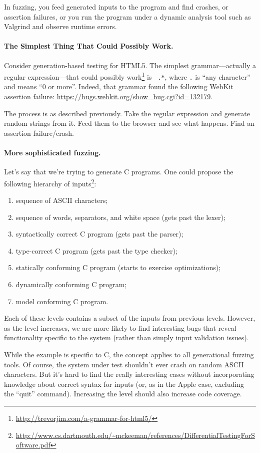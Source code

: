 \documentclass[11pt]{article}
\begin{document}
In fuzzing, you feed generated inputs to the program and find
crashes, or assertion failures, or you run the program under a dynamic
analysis tool such as Valgrind and observe runtime errors.

\paragraph{The Simplest Thing That Could Possibly Work.}
Consider generation-based testing for HTML5.  The simplest grammar---actually a regular
expression---that could possibly
work\footnote{\url{http://trevorjim.com/a-grammar-for-html5/}} is {\tt
  .*}, where {\tt .} is ``any character'' and {\tt *} means ``0 or
more''. Indeed, that grammar found the following WebKit assertion failure:
\url{https://bugs.webkit.org/show_bug.cgi?id=132179}.

The process is as described previously. Take the regular expression
and generate random strings from it.  Feed them to the browser and see
what happens. Find an assertion failure/crash.

\paragraph{More sophisticated fuzzing.} Let's say that we're trying to
generate C programs. One could propose the following hierarchy of inputs\footnote{\url{http://www.cs.dartmouth.edu/~mckeeman/references/DifferentialTestingForSoftware.pdf}}:
\begin{enumerate}
\item sequence of ASCII characters;
\item sequence of words, separators, and white space (gets past the lexer);
\item syntactically correct C program (gets past the parser);
\item type-correct C program (gets past the type checker);
\item statically conforming C program (starts to exercise optimizations);
\item dynamically conforming C program;
\item model conforming C program.
\end{enumerate}
Each of these levels contains a subset of the inputs from
previous levels. However, as the level increases, we are more likely
to find interesting bugs that reveal functionality specific
to the system (rather than simply input validation issues).

While the example is specific to C, the concept applies to all
generational fuzzing tools. Of course, the system under test
shouldn't ever crash on random ASCII characters. But it's hard
to find the really interesting cases without incorporating knowledge
about correct syntax for inputs (or, as in the Apple case, excluding
the ``quit'' command). Increasing the level should also increase
code coverage.
\end{document}
